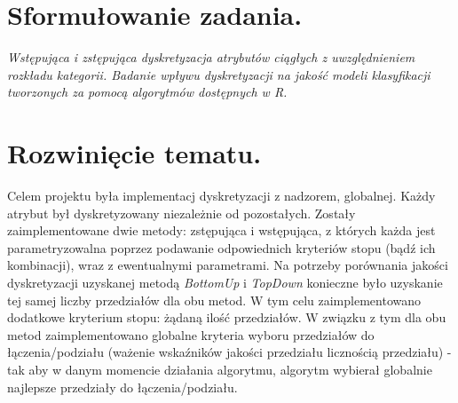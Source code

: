 
\section{Sformułowanie zadania.}
\emph{Wstępująca i zstępująca dyskretyzacja atrybutów ciągłych z uwzględnieniem rozkładu kategorii. Badanie wpływu dyskretyzacji na jakość modeli klasyfikacji tworzonych za pomocą algorytmów dostępnych w R.}

\section{Rozwinięcie tematu.}
Celem projektu była implementacj dyskretyzacji z nadzorem, globalnej. Każdy atrybut był dyskretyzowany niezależnie od pozostałych. Zostały zaimplementowane dwie metody: zstępująca i wstępująca, z których każda jest parametryzowalna poprzez podawanie odpowiednich kryteriów stopu (bądź ich kombinacji), wraz z ewentualnymi parametrami. Na potrzeby porównania jakości dyskretyzacji uzyskanej metodą \emph{BottomUp} i \emph{TopDown} konieczne było uzyskanie tej samej liczby przedziałów dla obu metod. W tym celu zaimplementowano dodatkowe kryterium stopu: żądaną ilość przedziałów. W związku z tym dla obu metod zaimplementowano globalne kryteria wyboru przedziałów do łączenia/podziału (ważenie wskaźników jakości przedziału licznością przedziału) - tak aby w danym momencie działania algorytmu, algorytm wybierał globalnie najlepsze przedziały do łączenia/podziału.
